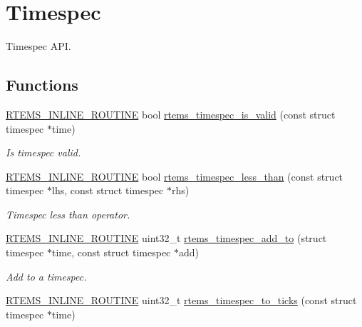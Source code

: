 \hypertarget{group__TimespecAPI}{}\section{Timespec}
\label{group__TimespecAPI}


Timespec A\+PI.  


\subsection*{Functions}
\begin{DoxyCompactItemize}
\item 
\mbox{\hyperlink{group__RTEMSScoreBaseDefs_gac216239df231d5dbd15e3520b0b9313f}{R\+T\+E\+M\+S\+\_\+\+I\+N\+L\+I\+N\+E\+\_\+\+R\+O\+U\+T\+I\+NE}} bool \mbox{\hyperlink{group__TimespecAPI_gaed8bb89c1846a54791fce69d167209dd}{rtems\+\_\+timespec\+\_\+is\+\_\+valid}} (const struct timespec $\ast$time)
\begin{DoxyCompactList}\small\item\em Is timespec valid. \end{DoxyCompactList}\item 
\mbox{\hyperlink{group__RTEMSScoreBaseDefs_gac216239df231d5dbd15e3520b0b9313f}{R\+T\+E\+M\+S\+\_\+\+I\+N\+L\+I\+N\+E\+\_\+\+R\+O\+U\+T\+I\+NE}} bool \mbox{\hyperlink{group__TimespecAPI_gaf258c96a1ed63d4a954dcc0b00d7dfa8}{rtems\+\_\+timespec\+\_\+less\+\_\+than}} (const struct timespec $\ast$lhs, const struct timespec $\ast$rhs)
\begin{DoxyCompactList}\small\item\em Timespec less than operator. \end{DoxyCompactList}\item 
\mbox{\hyperlink{group__RTEMSScoreBaseDefs_gac216239df231d5dbd15e3520b0b9313f}{R\+T\+E\+M\+S\+\_\+\+I\+N\+L\+I\+N\+E\+\_\+\+R\+O\+U\+T\+I\+NE}} uint32\+\_\+t \mbox{\hyperlink{group__TimespecAPI_ga62a5abddb03243a3f566abf063cc2349}{rtems\+\_\+timespec\+\_\+add\+\_\+to}} (struct timespec $\ast$time, const struct timespec $\ast$add)
\begin{DoxyCompactList}\small\item\em Add to a timespec. \end{DoxyCompactList}\item 
\mbox{\hyperlink{group__RTEMSScoreBaseDefs_gac216239df231d5dbd15e3520b0b9313f}{R\+T\+E\+M\+S\+\_\+\+I\+N\+L\+I\+N\+E\+\_\+\+R\+O\+U\+T\+I\+NE}} uint32\+\_\+t \mbox{\hyperlink{group__TimespecAPI_gab4f6fe9c48503e71a4382f6c05f404fe}{rtems\+\_\+timespec\+\_\+to\+\_\+ticks}} (const struct timespec $\ast$time)

\end{DoxyCompactItemize}
